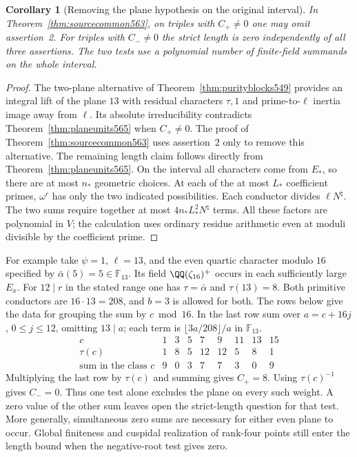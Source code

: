 \documentclass[a4paper,11pt]{article}
\newtheorem{corollary}[proposition]{Corollary}
\theoremstyle{definition}
\theoremstyle{remark}
\numberwithin{equation}{section}
\begin{document}
\begin{corollary}[Removing the plane hypothesis on the original interval]
\leavevmode\label{cor:planeinterval565}
In Theorem~\ref{thm:sourcecommon563}, on triples with
\(C_+\ne0\) one may omit assertion~2. For triples with
\(C_-\ne0\) the strict length is zero independently of all
three assertions. The two tests use a polynomial number of
finite-field summands on the whole interval.
\end{corollary}
\begin{proof}
The two-plane alternative of Theorem~\ref{thm:purityblocks549}
provides an integral lift of the plane \(13\) with residual
characters \(\tau,1\) and prime-to-\(\ell\) inertia image away
from \(\ell\). Its absolute irreducibility contradicts
Theorem~\ref{thm:planeunits565} when \(C_+\ne0\).
The proof of Theorem~\ref{thm:sourcecommon563} uses assertion~2
only to remove this alternative. The remaining length claim
follows directly from Theorem~\ref{thm:planeunits565}.
On the interval all characters come from \(E_*\), so there
are at most \(n_*\) geometric choices. At each of the at most
\(L_*\) coefficient primes, \(\omega^r\) has only the two
indicated possibilities. Each conductor divides \(\ell N^\natural\).
The two sums require together at most \(4n_* L_*^2 N^\natural\)
terms. All these factors are polynomial in \(V\); the calculation
uses ordinary residue arithmetic even at moduli divisible by
the coefficient prime.
\end{proof}

For example take \(\psi=1\), \(\ell=13\), and the even
quartic character modulo \(16\) specified by
\(\bar\alpha(5)=5\in\mathbb F_{13}\). Its field
\(\QQ(\zeta_{16})^+\) occurs in each sufficiently large \(E_x\).
For \(12\mid r\) in the stated range one has \(\tau=\bar\alpha\)
and \(\tau(13)=8\). Both primitive conductors are
\(16\cdot13=208\), and \(b=3\) is allowed for both.
The rows below give the data for grouping the sum by \(c\bmod16\).
In the last row sum over \(a=c+16j\), \(0\le j\le12\),
omitting \(13\mid a\); each term is \(\lfloor3a/208\rfloor/a\)
in \(\mathbb F_{13}\).
\[
 \begin{array}{c|rrrrrrrr}
 c                         &1&3&5&7&9&11&13&15\\ \hline
 \tau(c)                   &1&8&5&12&12&5&8&1\\
 \text{sum in the class }c &9&0&3&7&7&3&0&9
 \end{array}
\]
Multiplying the last row by \(\tau(c)\) and summing gives
\(C_+=8\). Using \(\tau(c)^{-1}\) gives \(C_-=0\).
Thus one test alone excludes the plane on every such weight.
A zero value of the other sum leaves open the strict-length
question for that test. More generally, simultaneous zero sums
are necessary for either even plane to occur. Global finiteness
and cuspidal realization of rank-four points still enter the
length bound when the negative-root test gives zero.
\end{document}
